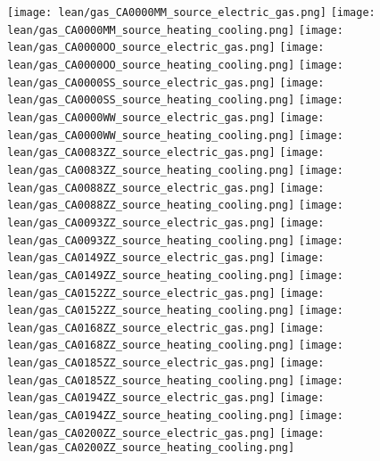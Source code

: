 \texttt{[image: lean/gas\_CA0000MM\_source\_electric\_gas.png]}
\texttt{[image: lean/gas\_CA0000MM\_source\_heating\_cooling.png]}
\texttt{[image: lean/gas\_CA0000OO\_source\_electric\_gas.png]}
\texttt{[image: lean/gas\_CA0000OO\_source\_heating\_cooling.png]}
\texttt{[image: lean/gas\_CA0000SS\_source\_electric\_gas.png]}
\texttt{[image: lean/gas\_CA0000SS\_source\_heating\_cooling.png]}
\texttt{[image: lean/gas\_CA0000WW\_source\_electric\_gas.png]}
\texttt{[image: lean/gas\_CA0000WW\_source\_heating\_cooling.png]}
\texttt{[image: lean/gas\_CA0083ZZ\_source\_electric\_gas.png]}
\texttt{[image: lean/gas\_CA0083ZZ\_source\_heating\_cooling.png]}
\texttt{[image: lean/gas\_CA0088ZZ\_source\_electric\_gas.png]}
\texttt{[image: lean/gas\_CA0088ZZ\_source\_heating\_cooling.png]}
\texttt{[image: lean/gas\_CA0093ZZ\_source\_electric\_gas.png]}
\texttt{[image: lean/gas\_CA0093ZZ\_source\_heating\_cooling.png]}
\texttt{[image: lean/gas\_CA0149ZZ\_source\_electric\_gas.png]}
\texttt{[image: lean/gas\_CA0149ZZ\_source\_heating\_cooling.png]}
\texttt{[image: lean/gas\_CA0152ZZ\_source\_electric\_gas.png]}
\texttt{[image: lean/gas\_CA0152ZZ\_source\_heating\_cooling.png]}
\texttt{[image: lean/gas\_CA0168ZZ\_source\_electric\_gas.png]}
\texttt{[image: lean/gas\_CA0168ZZ\_source\_heating\_cooling.png]}
\texttt{[image: lean/gas\_CA0185ZZ\_source\_electric\_gas.png]}
\texttt{[image: lean/gas\_CA0185ZZ\_source\_heating\_cooling.png]}
\texttt{[image: lean/gas\_CA0194ZZ\_source\_electric\_gas.png]}
\texttt{[image: lean/gas\_CA0194ZZ\_source\_heating\_cooling.png]}
\texttt{[image: lean/gas\_CA0200ZZ\_source\_electric\_gas.png]}
\texttt{[image: lean/gas\_CA0200ZZ\_source\_heating\_cooling.png]}
